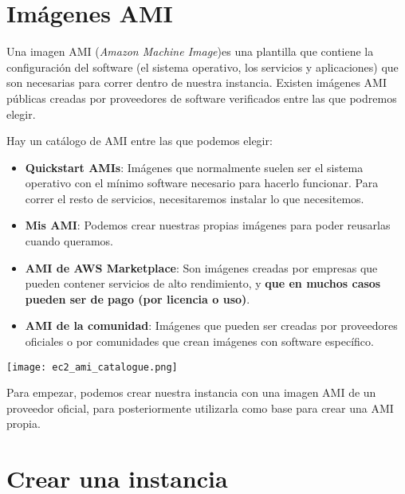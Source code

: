 

\section{Imágenes AMI}

Una imagen AMI (\textit{Amazon Machine Image})es una plantilla que contiene la configuración del software (el sistema operativo, los servicios y aplicaciones) que son necesarias para correr dentro de nuestra instancia. Existen imágenes AMI públicas creadas por proveedores de software verificados entre las que podremos elegir. 

Hay un catálogo de AMI entre las que podemos elegir:

\begin{itemize}
	\item \textbf{Quickstart AMIs}: Imágenes que normalmente suelen ser el sistema operativo con el mínimo software necesario para hacerlo funcionar. Para correr el resto de servicios, necesitaremos instalar lo que necesitemos.
	
	\item \textbf{Mis AMI}: Podemos crear nuestras propias imágenes para poder reusarlas cuando queramos.
	
	\item \textbf{AMI de AWS Marketplace}: Son imágenes creadas por empresas que pueden contener servicios de alto rendimiento, y \textbf{que en muchos casos pueden ser de pago (por licencia o uso)}.
	
	\item \textbf{AMI de la comunidad}: Imágenes que pueden ser creadas por proveedores oficiales o por comunidades que crean imágenes con software específico.
\end{itemize}

\begin{center}
	\texttt{[image: ec2\_ami\_catalogue.png]}
\end{center}





Para empezar, podemos crear nuestra instancia con una imagen AMI de un proveedor oficial, para posteriormente utilizarla como base para crear una AMI propia.


\section{Crear una instancia}

